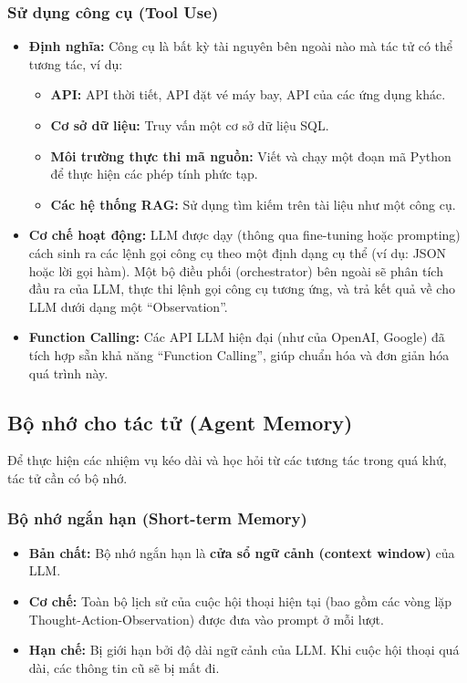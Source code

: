 \subsubsection{Sử dụng công cụ (Tool Use)}
\begin{itemize}
    \item \textbf{Định nghĩa:} Công cụ là bất kỳ tài nguyên bên ngoài nào mà tác tử có thể tương tác, ví dụ:
        \begin{itemize}
            \item \textbf{API:} API thời tiết, API đặt vé máy bay, API của các ứng dụng khác.
            \item \textbf{Cơ sở dữ liệu:} Truy vấn một cơ sở dữ liệu SQL.
            \item \textbf{Môi trường thực thi mã nguồn:} Viết và chạy một đoạn mã Python để thực hiện các phép tính phức tạp.
            \item \textbf{Các hệ thống RAG:} Sử dụng tìm kiếm trên tài liệu như một công cụ.
        \end{itemize}
    \item \textbf{Cơ chế hoạt động:} LLM được dạy (thông qua fine-tuning hoặc prompting) cách sinh ra các lệnh gọi công cụ theo một định dạng cụ thể (ví dụ: JSON hoặc lời gọi hàm). Một bộ điều phối (orchestrator) bên ngoài sẽ phân tích đầu ra của LLM, thực thi lệnh gọi công cụ tương ứng, và trả kết quả về cho LLM dưới dạng một “Observation”.
    \item \textbf{Function Calling:} Các API LLM hiện đại (như của OpenAI, Google) đã tích hợp sẵn khả năng “Function Calling”, giúp chuẩn hóa và đơn giản hóa quá trình này.
\end{itemize}

\subsection{Bộ nhớ cho tác tử (Agent Memory)}
\label{ssec:agent_memory}
Để thực hiện các nhiệm vụ kéo dài và học hỏi từ các tương tác trong quá khứ, tác tử cần có bộ nhớ.

\subsubsection{Bộ nhớ ngắn hạn (Short-term Memory)}
\begin{itemize}
    \item \textbf{Bản chất:} Bộ nhớ ngắn hạn là \textbf{cửa sổ ngữ cảnh (context window)} của LLM.
    \item \textbf{Cơ chế:} Toàn bộ lịch sử của cuộc hội thoại hiện tại (bao gồm các vòng lặp Thought-Action-Observation) được đưa vào prompt ở mỗi lượt.
    \item \textbf{Hạn chế:} Bị giới hạn bởi độ dài ngữ cảnh của LLM. Khi cuộc hội thoại quá dài, các thông tin cũ sẽ bị mất đi.
\end{itemize}

